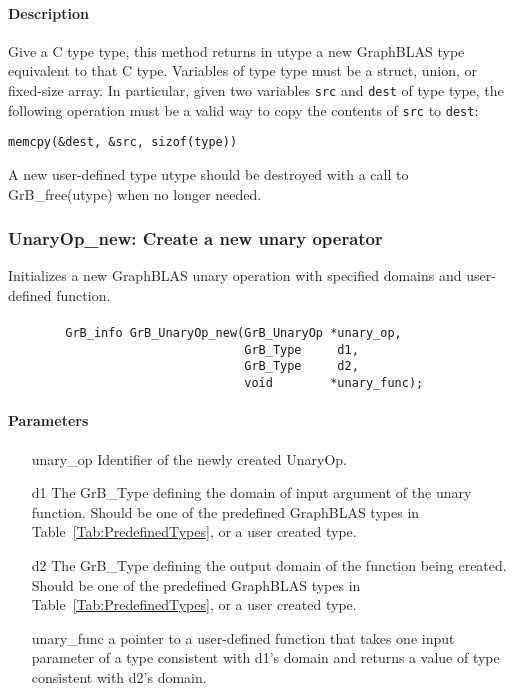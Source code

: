 \paragraph{Description}
Give a C type {\sf type}, this method returns in {\sf utype} a new GraphBLAS type equivalent to that C type.
Variables of type {\sf type} must be a struct, union, or fixed-size array. In particular, given two variables
{\tt src} and {\tt dest} of type {\sf type}, the following operation must be a valid way to copy the contents of
{\tt src} to {\tt dest}:

\begin{center}
{\tt memcpy(\&dest, \&src, sizof({\sf type}))}
\end{center}

A new user-defined type {\sf utype} should be destroyed with a call to {\sf GrB\_free(utype)} when no longer needed.

\subsubsection{{\sf UnaryOp\_new}: Create a new unary operator}

Initializes a new GraphBLAS unary operation with specified domains and user-defined function.


\paragraph{\syntax}

\begin{verbatim}
        GrB_info GrB_UnaryOp_new(GrB_UnaryOp *unary_op,
                                 GrB_Type     d1,
                                 GrB_Type     d2,
                                 void        *unary_func);
\end{verbatim}

\paragraph{Parameters}

\begin{itemize}[leftmargin=1.1in]
    \item[{\sf unary\_op}]      Identifier of the newly created UnaryOp.
    \item[{\sf d1}]        The {\sf GrB\_Type} defining the domain of input argument of
    the unary function. Should be one of the predefined
    GraphBLAS types in Table~\ref{Tab:PredefinedTypes}, or a user created type.
    \item[{\sf d2}]       The {\sf GrB\_Type} defining the output domain of the function
    being created.  Should be one of the predefined
    GraphBLAS types in Table~\ref{Tab:PredefinedTypes}, or a user created type.
    \item[{\sf unary\_func}]     a pointer to a user-defined function that takes one input 
    parameter of a type consistent with {\sf d1}'s domain and returns a value of type consistent with {\sf d2}'s domain.
\end{itemize}


